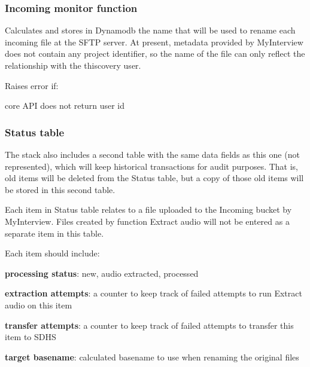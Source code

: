 \documentclass{article}
\renewcommand{\emph}[1]{\textbf{#1}}
\begin{document}
\subsubsection*{Incoming monitor function}
Calculates and stores in Dynamodb the name that will be used to rename each incoming file at the SFTP server. At present, metadata provided by MyInterview does not contain any project identifier, so the name of the file can only reflect the relationship with the thiscovery user.

Raises error if:
\begin{compactenum}
\item core API does not return user id
\end{compactenum}


\subsubsection*{Status table}
The stack also includes a second table with the same data fields as this one (not represented), which will keep historical transactions for audit purposes. That is, old items will be deleted from the Status table, but a copy of those old items will be stored in this second table.

Each item in Status table relates to a file uploaded to the Incoming bucket by MyInterview. Files created by function Extract audio will not be entered as a separate item in this table.

Each item should include:
\begin{compactenum}
\item \emph{processing status}: new, audio extracted, processed
\item \emph{extraction attempts}: a counter to keep track of failed attempts to run Extract audio on this item
\item \emph{transfer attempts}: a counter to keep track of failed attempts to transfer this item to SDHS
\item \emph{target basename}: calculated basename to use when renaming the original files
\end{compactenum}
\end{document}

